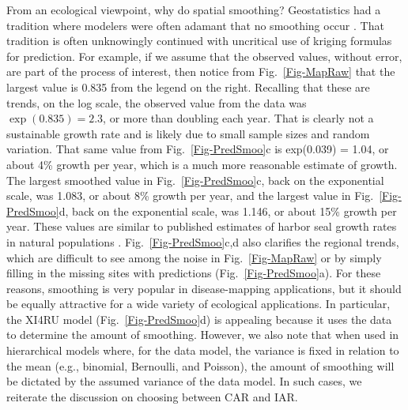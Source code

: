 \documentclass[11pt, titlepage]{article}\usepackage[]{graphicx}\usepackage[]{color}
\begin{document}
\begin{spacing}{1.9}
\begin{flushleft}
From an ecological viewpoint, why do spatial smoothing?  Geostatistics had a tradition where modelers were often adamant that no smoothing occur \citep[``honoring the data,''][p. 224]{Scha:Gotw:stat:2005}. That tradition is often unknowingly continued with uncritical use of kriging formulas for prediction.  For example, if we assume that the observed values, without error, are part of the process of interest, then notice from Fig.~\ref{Fig-MapRaw} that the largest value is 0.835 from the legend on the right.  Recalling that these are trends, on the log scale, the observed value from the data was $\exp(0.835)=2.3$, or more than doubling each year.  That is clearly not a sustainable growth rate and is likely due to small sample sizes and random variation.  That same value from Fig.~\ref{Fig-PredSmoo}c is exp(0.039) = 1.04, or about 4\% growth per year, which is a much more reasonable estimate of growth.  The largest smoothed value in Fig.~\ref{Fig-PredSmoo}c, back on the exponential scale, was 1.083, or about 8\% growth per year, and the largest value in Fig.~\ref{Fig-PredSmoo}d, back on the exponential scale, was 1.146, or about 15\% growth per year. These values are similar to published estimates of harbor seal growth rates in natural populations \citep[e.g.,][]{Hast:Smal:Pend:sex:2012}.  Fig.~\ref{Fig-PredSmoo}c,d also clarifies the regional trends, which are difficult to see among the noise in Fig.~\ref{Fig-MapRaw} or by simply filling in the missing sites with predictions (Fig.~\ref{Fig-PredSmoo}a).  For these reasons, smoothing is very popular in disease-mapping applications, but it should be equally attractive for a wide variety of ecological applications. In particular, the XI4RU model (Fig.~\ref{Fig-PredSmoo}d) is appealing because it uses the data to determine the amount of smoothing.  However, we also note that when used in hierarchical models where, for the data model, the variance is fixed in relation to the mean (e.g., binomial, Bernoulli, and Poisson), the amount of smoothing will be dictated by the assumed variance of the data model.  In such cases, we reiterate the discussion on choosing between CAR and IAR.


\end{flushleft}
\end{spacing}
\end{document}
